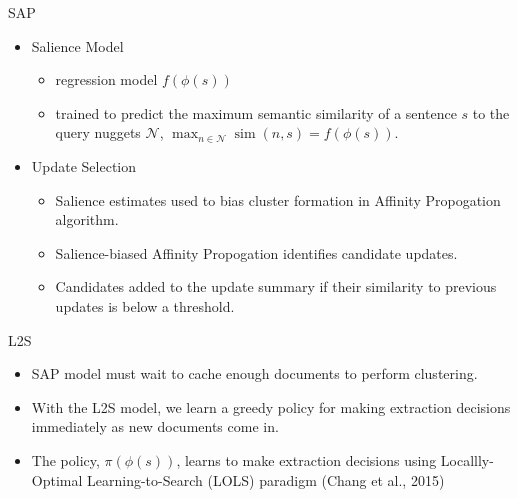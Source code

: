 \begin{frame}{SAP}

    \begin{itemize}
        \item Salience Model 
    \begin{itemize}
        \item regression model $f(\phi(s))$
        \item trained to predict the maximum semantic similarity of 
            a sentence $s$ to the query nuggets $\mathcal{N}$,
        $\max_{n \in \mathcal{N}} \operatorname{sim}(n, s) = f(\phi(s))$.



    \end{itemize}
    \vspace{10pt}
\item Update Selection
    \begin{itemize}
        \item Salience estimates used to bias cluster formation in 
            Affinity Propogation algorithm.
        \item Salience-biased Affinity Propogation identifies candidate updates.
        \item Candidates added to the update summary if their similarity to
            previous updates is below a threshold.
    \end{itemize}

    \end{itemize}

\end{frame}

\begin{frame}{L2S}

    \begin{itemize}
        \item SAP model must wait to cache enough documents to perform clustering.
            \vspace{10pt}
        \item With the L2S model, we learn a greedy policy for making extraction decisions immediately as new documents come in.
            \vspace{10pt}
        \item The policy, $\pi(\phi(s))$, learns to make extraction decisions using Locallly-Optimal Learning-to-Search (LOLS) paradigm (Chang et al., 2015)

    \end{itemize}

\end{frame}

